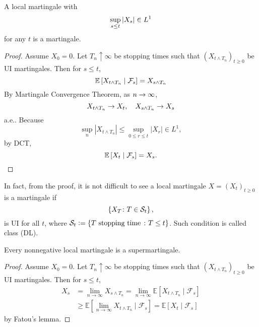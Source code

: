 \begin{lem}
    A local martingale with
    \begin{equation*}
    	\sup_{s \leq t}\left\lvert X_s\right\lvert \in L^1
    \end{equation*}
    for any $t$ is a martingale.
\end{lem}
\begin{proof}
    Assume $X_0 = 0$. Let $T_n \uparrow \infty$ be stopping times such that $(X_{t \wedge T_n})_{t \geq 0}$ be UI martingales. Then for $s \leq t$,
    \begin{equation*}
    	\mathbb{E}\left[X_{t \wedge T_n} \mid \mathcal{F}_s\right] = X_{s \wedge T_n}
    \end{equation*}
    By Martingale Convergence Theorem, as $n \rightarrow \infty$,
    \begin{equation*}
    	X_{t \wedge T_n} \rightarrow X_t,\quad X_{s \wedge T_n} \rightarrow X_s
    \end{equation*}
    a.e.. Because
    \begin{equation*}
    	\sup _n\left|X_{t \wedge T_n}\right| \leq \sup _{0 \leq r \leq t}\left|X_r\right| \in L^1,
    \end{equation*}
    by DCT,
    \begin{equation*}
    	\mathbb{E}\left[X_{t} \mid \mathcal{F}_s\right] = X_{s}.
    \end{equation*}
\end{proof}
\begin{rmk}
    In fact, from the proof, it is not difficult to see a local martingale $X=(X_t)_{t \geq 0}$ is a martingale if
    \begin{equation*}
    	\left\{X_T \colon T \in \mathcal{S}_t\right\},
    \end{equation*}
    is UI for all $t$, where $\mathcal{S}_t \vcentcolon= \left\{T \text{ stopping time } \colon T \leq t\right\}$. Such condition is called class (DL).
\end{rmk}

\begin{prop}
    Every nonnegative local martingale is a supermartingale.
\end{prop}
\begin{proof}
    Assume $X_0 = 0$. Let $T_n \uparrow \infty$ be stopping times such that $(X_{t \wedge T_n})_{t \geq 0}$ be UI martingales. Then for $s \leq t$,
    \begin{align*}
		X_s & =\lim _{n \rightarrow \infty} X_{s \wedge T_n}=\lim _{n \rightarrow \infty} \mathbb{E}\left[X_{t \wedge T_n} \mid \mathcal{F}_s\right] \\
		& \geq \mathbb{E}\left[\lim _{n \rightarrow \infty} X_{t \wedge T_n} \mid \mathcal{F}_s\right]=\mathbb{E}\left[X_t \mid \mathcal{F}_s\right]
    \end{align*}
    by Fatou's lemma.
\end{proof}

